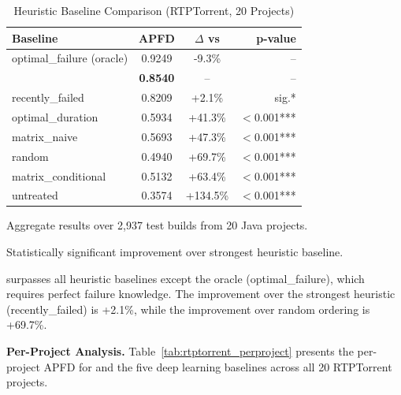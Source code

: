 \begin{table}[!t]
\centering
\caption{Heuristic Baseline Comparison (RTPTorrent, 20 Projects)}
\label{tab:rtptorrent_heuristic}
\scriptsize
\begin{tabular}{lccr}
\toprule
\textbf{Baseline} & \textbf{APFD} & \textbf{$\Delta$ vs \filopriori{}} & \textbf{p-value} \\
\midrule
optimal\_failure (oracle) & 0.9249 & -9.3\% & -- \\
\textbf{\filopriori{}} & \textbf{0.8540} & -- & -- \\
recently\_failed & 0.8209 & +2.1\% & sig.* \\
optimal\_duration & 0.5934 & +41.3\% & $<$0.001*** \\
matrix\_naive & 0.5693 & +47.3\% & $<$0.001*** \\
random & 0.4940 & +69.7\% & $<$0.001*** \\
matrix\_conditional & 0.5132 & +63.4\% & $<$0.001*** \\
untreated & 0.3574 & +134.5\% & $<$0.001*** \\
\bottomrule
\end{tabular}
\begin{tablenotes}
\small
\item Aggregate results over 2,937 test builds from 20 Java projects.
\item * Statistically significant improvement over strongest heuristic baseline.
\end{tablenotes}
\end{table}

\filopriori{} surpasses all heuristic baselines except the oracle
(optimal\_failure), which requires perfect failure knowledge. The improvement
over the strongest heuristic (recently\_failed) is +2.1\%, while the
improvement over random ordering is +69.7\%.

\textbf{Per-Project Analysis.}
Table~\ref{tab:rtptorrent_perproject} presents the per-project APFD for
\filopriori{} and the five deep learning baselines across all 20 RTPTorrent
projects.

